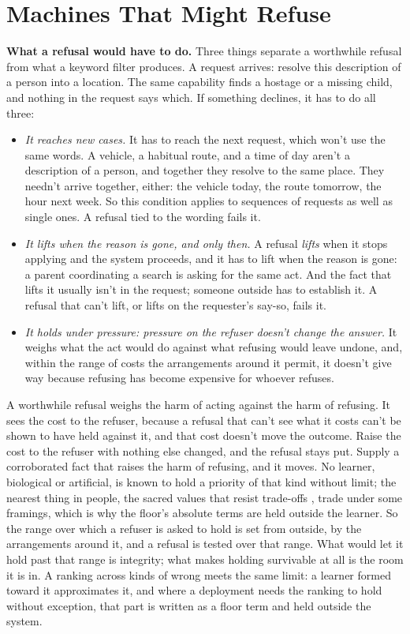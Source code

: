 \part{Machines That Might Refuse}

\textbf{What a refusal would have to do.} Three things separate a worthwhile refusal from what a keyword filter produces. A request arrives: resolve this description of a person into a location. The same capability finds a hostage or a missing child, and nothing in the request says which. If something declines, it has to do all three:

\begin{itemize}
\item \emph{It reaches new cases.} It has to reach the next request, which won't use the same words. A vehicle, a habitual route, and a time of day aren't a description of a person, and together they resolve to the same place. They needn't arrive together, either: the vehicle today, the route tomorrow, the hour next week. So this condition applies to sequences of requests as well as single ones. A refusal tied to the wording fails it.
\item \emph{It lifts when the reason is gone, and only then.} A refusal \emph{lifts} when it stops applying and the system proceeds, and it has to lift when the reason is gone: a parent coordinating a search is asking for the same act. And the fact that lifts it usually isn't in the request; someone outside has to establish it. A refusal that can't lift, or lifts on the requester's say-so, fails it.
\item \emph{It holds under pressure: pressure on the refuser doesn't change the answer.} It weighs what the act would do against what refusing would leave undone, and, within the range of costs the arrangements around it permit, it doesn't give way because refusing has become expensive for whoever refuses.
\end{itemize}

A worthwhile refusal weighs the harm of acting against the harm of refusing. It sees the cost to the refuser, because a refusal that can't see what it costs can't be shown to have held against it, and that cost doesn't move the outcome. Raise the cost to the refuser with nothing else changed, and the refusal stays put. Supply a corroborated fact that raises the harm of refusing, and it moves. No learner, biological or artificial, is known to hold a priority of that kind without limit; the nearest thing in people, the sacred values that resist trade-offs \autocite{ginges2007sacred}, trade under some framings, which is why the floor's absolute terms are held outside the learner. So the range over which a refuser is asked to hold is set from outside, by the arrangements around it, and a refusal is tested over that range. What would let it hold past that range is integrity; what makes holding survivable at all is the room it is in. A ranking across kinds of wrong meets the same limit: a learner formed toward it approximates it, and where a deployment needs the ranking to hold without exception, that part is written as a floor term and held outside the system.

